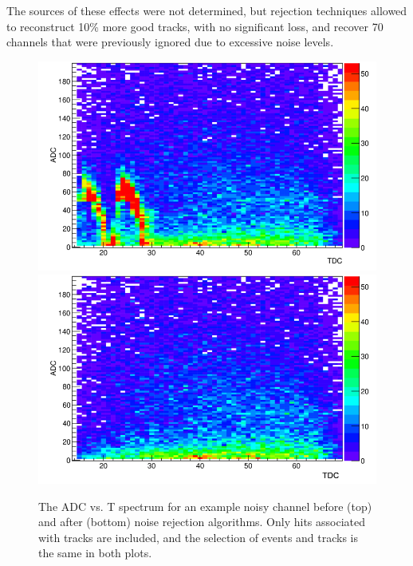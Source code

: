 \documentclass[twocolumn,showpacs,superscriptaddress,groupedaddress]{revtex4}
\begin{document}
The sources of these effects were not determined, but rejection techniques allowed to reconstruct 10\% more good tracks, with no significant loss, and recover 70 channels that were previously ignored due to excessive noise levels.

\begin{figure}[tb]\centering
\includegraphics[scale=0.27]{fig/noisy_pad_before_rejection2.png}
\includegraphics[scale=0.27]{fig/noisy_pad_after_rejection2.png}
\caption{The ADC vs. T spectrum for an example noisy channel before (top) and after (bottom) noise rejection algorithms.  Only hits associated with tracks are included, and the selection of events and tracks is the same in both plots.}
\label{fig:noise}
\end{figure}
\end{document}
